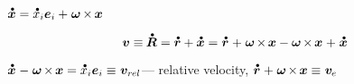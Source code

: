 \begin{otherlanguage}{russian}
${
\mathdotabove{\bm{x}} = \mathdotabove{x}_i \bm{e}_i + \hspace{.1ex} \bm{\omega} \hspace{-0.16ex} \times \hspace{-0.16ex} \bm{x}
}$

\begin{equation*}
\bm{v} \equiv \hspace{-0.1ex} \mathdotabove{\bm{R}} = \mathdotabove{\bm{r}} + \mathdotabove{\bm{x}}
= \hspace{-0.2ex} \tikzmark{beginEVelocity} \hspace{.25ex} \mathdotabove{\bm{r}} \hspace{.1ex} + \hspace{.1ex} \bm{\omega} \hspace{-0.2ex} \times \hspace{-0.2ex} \bm{x} \tikzmark{endEVelocity}
\hspace{.4ex} \tikzmark{beginRelativeVelocity} \hspace{-0.4ex} - \bm{\omega} \hspace{-0.2ex} \times \hspace{-0.2ex} \bm{x} \hspace{.1ex} + \hspace{.1ex} \mathdotabove{\bm{x}} \hspace{-0.33ex} \tikzmark{endRelativeVelocity}
\end{equation*}%

${
\mathdotabove{\bm{x}} \hspace{.1ex} - \hspace{.1ex} \bm{\omega} \hspace{-0.2ex} \times \hspace{-0.2ex} \bm{x} = \mathdotabove{x}_i \bm{e}_i
\equiv \hspace{.1ex} \bm{v}_{r\kern-0.1exel}
}$\:--- relative velocity,
${
\mathdotabove{\bm{r}} \hspace{.1ex} + \hspace{.1ex} \bm{\omega} \hspace{-0.2ex} \times \hspace{-0.2ex} \bm{x}
\equiv \hspace{.1ex} \bm{v}_{\hspace{-0.1ex}e}
}$


\end{otherlanguage}
